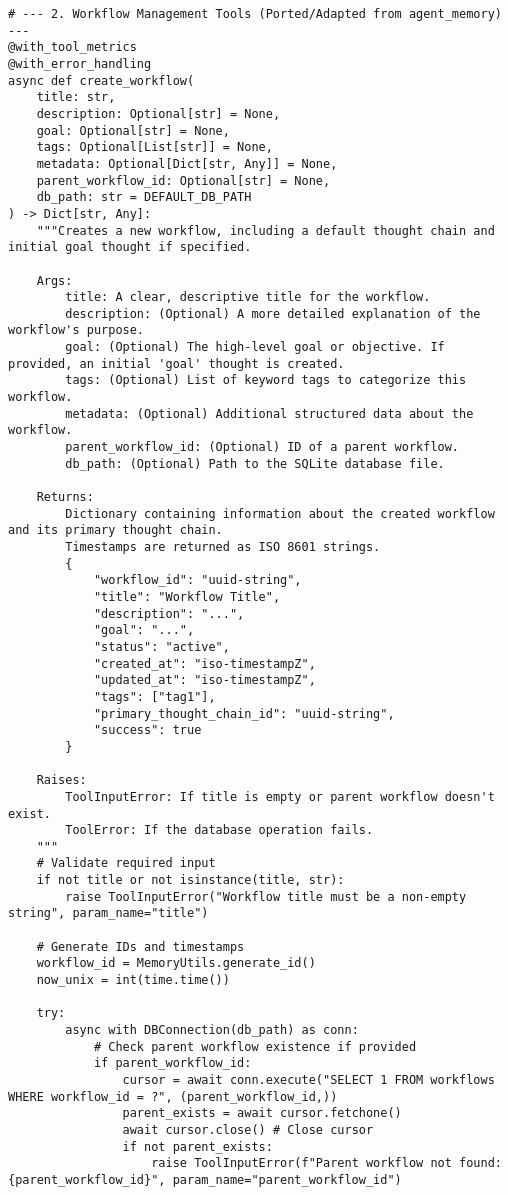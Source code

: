 \documentclass[12pt,a4paper]{article}
\begin{document}
\begin{pageablecode}
\begin{verbatim}
# --- 2. Workflow Management Tools (Ported/Adapted from agent_memory) ---
@with_tool_metrics
@with_error_handling
async def create_workflow(
    title: str,
    description: Optional[str] = None,
    goal: Optional[str] = None,
    tags: Optional[List[str]] = None,
    metadata: Optional[Dict[str, Any]] = None,
    parent_workflow_id: Optional[str] = None,
    db_path: str = DEFAULT_DB_PATH
) -> Dict[str, Any]:
    """Creates a new workflow, including a default thought chain and initial goal thought if specified.

    Args:
        title: A clear, descriptive title for the workflow.
        description: (Optional) A more detailed explanation of the workflow's purpose.
        goal: (Optional) The high-level goal or objective. If provided, an initial 'goal' thought is created.
        tags: (Optional) List of keyword tags to categorize this workflow.
        metadata: (Optional) Additional structured data about the workflow.
        parent_workflow_id: (Optional) ID of a parent workflow.
        db_path: (Optional) Path to the SQLite database file.

    Returns:
        Dictionary containing information about the created workflow and its primary thought chain.
        Timestamps are returned as ISO 8601 strings.
        {
            "workflow_id": "uuid-string",
            "title": "Workflow Title",
            "description": "...",
            "goal": "...",
            "status": "active",
            "created_at": "iso-timestampZ",
            "updated_at": "iso-timestampZ",
            "tags": ["tag1"],
            "primary_thought_chain_id": "uuid-string",
            "success": true
        }

    Raises:
        ToolInputError: If title is empty or parent workflow doesn't exist.
        ToolError: If the database operation fails.
    """
    # Validate required input
    if not title or not isinstance(title, str):
        raise ToolInputError("Workflow title must be a non-empty string", param_name="title")

    # Generate IDs and timestamps
    workflow_id = MemoryUtils.generate_id()
    now_unix = int(time.time())

    try:
        async with DBConnection(db_path) as conn:
            # Check parent workflow existence if provided
            if parent_workflow_id:
                cursor = await conn.execute("SELECT 1 FROM workflows WHERE workflow_id = ?", (parent_workflow_id,))
                parent_exists = await cursor.fetchone()
                await cursor.close() # Close cursor
                if not parent_exists:
                    raise ToolInputError(f"Parent workflow not found: {parent_workflow_id}", param_name="parent_workflow_id")


\end{verbatim}
\end{pageablecode}
\end{document}
